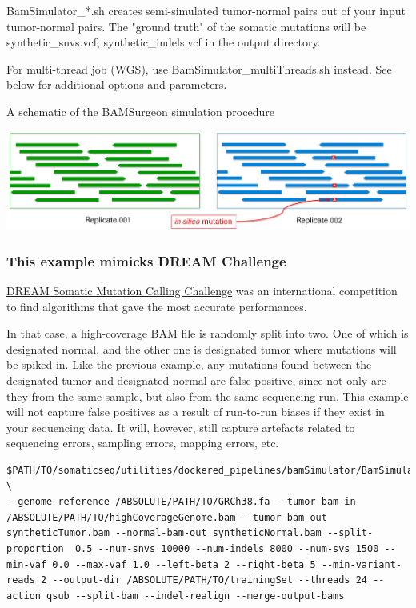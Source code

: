 \documentclass[10pt,letterpaper]{article}
\begin{document}
\begin{sloppypar}
BamSimulator\_*.sh creates semi-simulated tumor-normal pairs out of your input tumor-normal pairs. The "ground truth" of the somatic mutations will be synthetic\_snvs.vcf, synthetic\_indels.vcf in the output directory.

For multi-thread job (WGS), use BamSimulator\_multiThreads.sh instead. See below for additional options and parameters.


A schematic of the BAMSurgeon simulation procedure


\begin{center}

  \includegraphics[width=6.5in]{../utilities/dockered_pipelines/bamSimulator/replicate_sim.jpg}
\end{center}





\subsubsection{This example mimicks DREAM Challenge}

\href{https://www.synapse.org/#!Synapse:syn312572/wiki/70726}{DREAM Somatic Mutation Calling Challenge} was an international competition to find algorithms that gave the most accurate performances. 

In that case, a high-coverage BAM file is randomly split into two. One of which is designated normal, and the other one is designated tumor where mutations will be spiked in. Like the previous example, any mutations found between the designated tumor and designated normal are false positive, since not only are they from the same sample, but also from the same sequencing run. This example will not capture false positives as a result of run-to-run biases if they exist in your sequencing data. It will, however, still capture artefacts related to sequencing errors, sampling errors, mapping errors, etc.


\begin{lstlisting}
$PATH/TO/somaticseq/utilities/dockered_pipelines/bamSimulator/BamSimulator_multiThreads.sh \
--genome-reference /ABSOLUTE/PATH/TO/GRCh38.fa --tumor-bam-in /ABSOLUTE/PATH/TO/highCoverageGenome.bam --tumor-bam-out syntheticTumor.bam --normal-bam-out syntheticNormal.bam --split-proportion  0.5 --num-snvs 10000 --num-indels 8000 --num-svs 1500 --min-vaf 0.0 --max-vaf 1.0 --left-beta 2 --right-beta 5 --min-variant-reads 2 --output-dir /ABSOLUTE/PATH/TO/trainingSet --threads 24 --action qsub --split-bam --indel-realign --merge-output-bams
\end{lstlisting}


\end{sloppypar}
\end{document}
